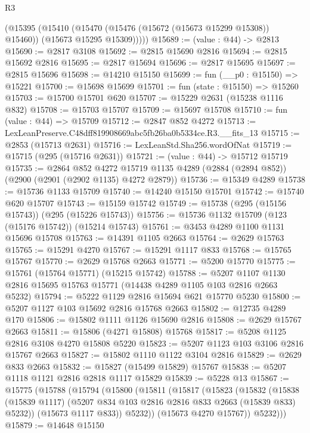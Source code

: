 \begin{lexlean}{R3}
\begin{coremodule}
        (@15395
          (@15410
            (@15470 (@15476 (@15672 (@15673 @15299 @15308)) @15460))
            (@15673 @15295 @15309)))))
@15689 := (value : @44) -> @2813
@15690 := @2817 @3108
@15692 := @2815 @15690 @2816
@15694 := @2815 @15692 @2816
@15695 := @2817 @15694
@15696 := @2817 @15695
@15697 := @2815 @15696
@15698 := @14210 @15150
@15699 := fun (__p0 : @15150) => @15221
@15700 := @15698 @15699
@15701 := fun (state : @15150) => @15260
@15703 := @15700 @15701 @620
@15707 := @15229 @2631 (@15238 @1116 @832)
@15708 := @15703 @15707
@15709 := @15697 @15708
@15710 := fun (value : @44) => @15709
@15712 := @2847 @852 @4272
@15713 := LexLeanPreserve.C48dff819908669abc5fb26ba0b5334ce.R3.__fits_13
@15715 := @2853 (@15713 @2631)
@15716 := LexLeanStd.Sha256.wordOfNat
@15719 := @15715 (@295 (@15716 @2631))
@15721 := (value : @44) -> @15712 @15719
@15735 := @2864
    @852
    @4272
    @15719
    @1135
    @4289
    (@2884 (@2894 @852))
    (@2900 (@2901 (@2902 @1135) @4272 @2879))
@15736 := @15349 @4289
@15738 := @15736 @1133 @15709
@15740 := @14240 @15150 @15701
@15742 := @15740 @620 @15707
@15743 := @15159 @15742
@15749 := @15738 (@295 (@15156 @15743)) (@295 (@15226 @15743))
@15756 := @15736 @1132 @15709 (@123 (@15176 @15742)) (@15214 @15743)
@15761 := @3453 @4289 @1100 @1131 @15696 @15708
@15763 := @14391 @1105 @2663
@15764 := @2629 @15763
@15765 := @15291 @4270
@15767 := @15291 @1117 @833
@15768 := @15765 @15767
@15770 := @2629 @15768 @2663
@15771 := @5200 @15770
@15775 := @15761 (@15764 @15771) (@15215 @15742)
@15788 := @5207 @1107 @1130 @2816 @15695 @15763 @15771 (@14438 @4289 @1105 @103 @2816 @2663 @5232)
@15794 := @5222 @1129 @2816 @15694 @621 @15770 @5230
@15800 := @5207 @1127 @103 @15692 @2816 @15768 @2663
@15802 := @12735 @4289 @170
@15806 := @15802 @1111 @1126 @15690 @2816
@15808 := @2629 @15767 @2663
@15811 := @15806 (@4271 @15808) @15768
@15817 := @5208 @1125 @2816 @3108 @4270 @15808 @5220
@15823 := @5207 @1123 @103 @3106 @2816 @15767 @2663
@15827 := @15802 @1110 @1122 @3104 @2816
@15829 := @2629 @833 @2663
@15832 := @15827 (@15499 @15829) @15767
@15838 := @5207 @1118 @1121 @2816 @2818 @1117 @15829
@15839 := @5228 @13
@15867 := @15775
    (@15788
      (@15794
        (@15800
          (@15811
            (@15817
              (@15823
                (@15832
                  (@15838
                    (@15839 @1117)
                    (@5207 @834 @103 @2816 @2816 @833 @2663 (@15839 @833) @5232))
                  (@15673 @1117 @833))
                @5232))
            (@15673 @4270 @15767))
          @5232)))
@15879 := @14648
    @15150

\end{coremodule}
\end{lexlean}
